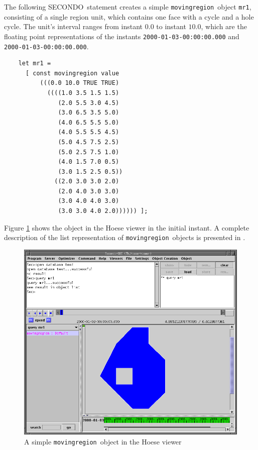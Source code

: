 \documentclass[a4paper,12pt]{article}
\newcommand{\secondo}{{\scshape SE\-CON\-DO}}
\newcommand{\mr}{{\tt movingregion}}
\begin{document}
The following \secondo\ statement creates a simple \mr\ object {\tt mr1},
consisting
of a single region unit, which contains one face with a cycle and a hole
cycle. The unit's interval ranges from instant $0.0$ to instant $10.0$,
which are the
floating point representations of the instants {\tt 2000-01-03-00:00:00.000}
and {\tt 2000-01-03-00:00:00.000}.
\begin{verbatim}
    let mr1 = 
      [ const movingregion value 
          (((0.0 10.0 TRUE TRUE)
            ((((1.0 3.5 1.5 1.5)
               (2.0 5.5 3.0 4.5)
               (3.0 6.5 3.5 5.0)
               (4.0 6.5 5.5 5.0)
               (4.0 5.5 5.5 4.5)
               (5.0 4.5 7.5 2.5)
               (5.0 2.5 7.5 1.0)
               (4.0 1.5 7.0 0.5)
               (3.0 1.5 2.5 0.5))
              ((2.0 3.0 3.0 2.0)
               (2.0 4.0 3.0 3.0)
               (3.0 4.0 4.0 3.0)
               (3.0 3.0 4.0 2.0)))))) ];
\end{verbatim}
Figure
\ref{creating:simple1} shows the object in the Hoese viewer in the initial
instant. A complete description of the list representation of \mr\ objects is
presented in \cite{LeB04}.
\begin{figure}
  \begin{center}
    \includegraphics[scale=0.4]{screenshot01.png}
  \end{center}
  \caption{A simple \mr\ object in the Hoese viewer}
  \label{creating:simple1}
\end{figure}
\end{document}
